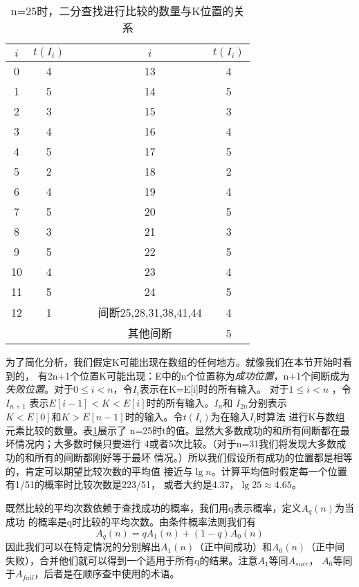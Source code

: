 \begin{table}
    \centering
\begin{tabular}{cccccc}
\hline
    $i$ & $t(I_i)$  &   &   &$i$  & $t(I_i)$ \\
    \hline
    0   &4  & &            &13  & 4\\
    1   &5  & &            &14  &5 \\
    2   &3  & &            &15  &3 \\
    3   &4  & &            &16  &4 \\
    4   &5  & &            &17  &5 \\
    5   &2  & &            &18  &2 \\
    6   &4  & &            &19  &4 \\
    7   &5  & &            &20  &5 \\
    8   &3  & &            &21  &3 \\
    9   &5  & &            &22  &5 \\
    10  &4  & &            &23  &4 \\
    11  &5  & &            &24  &5 \\
    12  &1  & &            &间断25,28,31,38,41,44   &4 \\
        &   & &            &其他间断    &5\\
\hline
\end{tabular}
\caption{n=25时，二分查找进行比较的数量与K位置的关系}
\label{Table:BinrarySearchCompareCount}
\end{table}

为了简化分析，我们假定K可能出现在数组的任何地方。就像我们在本节开始时看到的，
有2n+1个位置K可能出现：E中的n个位置称为\emph{成功位置}，n+1个间断成为
\emph{失败位置}。对于$0\leq i <n$，令$I_i$表示在K=E[i]时的所有输入。
对于$1\leq i <n$ ，令$I_{n+1}$ 表示$E[i-1]<K<E[i]$时的所有输入。$I_n$和
$I_{2n}$分别表示$K<E[0]和K>E[n-1]$时的输入。令$t(I_i)$为在输入$I_i$时算法
进行K与数组元素比较的数量。表\ref{Table:BinrarySearchCompareCount}展示了
n=25时t的值。显然大多数成功的和所有间断都在最坏情况内；大多数时候只要进行
4或者5次比较。（对于n=31我们将发现大多数成功的和所有的间断都刚好等于最坏
情况。）所以我们假设所有成功的位置都是相等的，肯定可以期望比较次数的平均值
接近与$\lg n$。计算平均值时假定每一个位置有1/51的概率时比较次数是223/51，
或者大约是4.37，$\lg 25\approx 4.65$。

既然比较的平均次数依赖于查找成功的概率，我们用q表示概率，定义$A_q(n)$为当成功
的概率是q时比较的平均次数。由条件概率法则我们有
\begin{displaymath}
A_q(n)=qA_1(n)+(1-q)A_0(n)
\end{displaymath}
\noindent
因此我们可以在特定情况的分别解出$A_1(n)$（正中间成功）和$A_0(n)$（正中间
失败），合并他们就可以得到一个适用于所有q的结果。注意$A_1$等同$A_{succ}$，
$A_0$等同于$A_{fail}$，后者是在顺序查中使用的术语。

